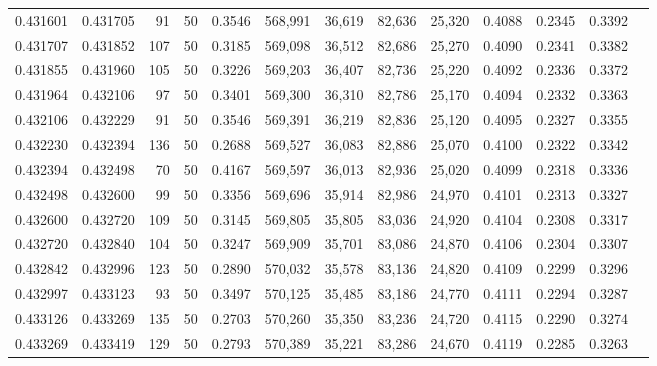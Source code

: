 \begin{tabular}{rrrrrrrrrrrrr}
0.431601 & 0.431705 &    91 &  50 &                                     0.3546 & 568,991 &  36,619 &  82,636 &  25,320 & 0.4088 & 0.2345 & 0.3392 \\
0.431707 & 0.431852 &   107 &  50 &                                     0.3185 & 569,098 &  36,512 &  82,686 &  25,270 & 0.4090 & 0.2341 & 0.3382 \\
0.431855 & 0.431960 &   105 &  50 &                                     0.3226 & 569,203 &  36,407 &  82,736 &  25,220 & 0.4092 & 0.2336 & 0.3372 \\
0.431964 & 0.432106 &    97 &  50 &                                     0.3401 & 569,300 &  36,310 &  82,786 &  25,170 & 0.4094 & 0.2332 & 0.3363 \\
0.432106 & 0.432229 &    91 &  50 &                                     0.3546 & 569,391 &  36,219 &  82,836 &  25,120 & 0.4095 & 0.2327 & 0.3355 \\
0.432230 & 0.432394 &   136 &  50 &                                     0.2688 & 569,527 &  36,083 &  82,886 &  25,070 & 0.4100 & 0.2322 & 0.3342 \\
0.432394 & 0.432498 &    70 &  50 &                                     0.4167 & 569,597 &  36,013 &  82,936 &  25,020 & 0.4099 & 0.2318 & 0.3336 \\
0.432498 & 0.432600 &    99 &  50 &                                     0.3356 & 569,696 &  35,914 &  82,986 &  24,970 & 0.4101 & 0.2313 & 0.3327 \\
0.432600 & 0.432720 &   109 &  50 &                                     0.3145 & 569,805 &  35,805 &  83,036 &  24,920 & 0.4104 & 0.2308 & 0.3317 \\
0.432720 & 0.432840 &   104 &  50 &                                     0.3247 & 569,909 &  35,701 &  83,086 &  24,870 & 0.4106 & 0.2304 & 0.3307 \\
0.432842 & 0.432996 &   123 &  50 &                                     0.2890 & 570,032 &  35,578 &  83,136 &  24,820 & 0.4109 & 0.2299 & 0.3296 \\
0.432997 & 0.433123 &    93 &  50 &                                     0.3497 & 570,125 &  35,485 &  83,186 &  24,770 & 0.4111 & 0.2294 & 0.3287 \\
0.433126 & 0.433269 &   135 &  50 &                                     0.2703 & 570,260 &  35,350 &  83,236 &  24,720 & 0.4115 & 0.2290 & 0.3274 \\
0.433269 & 0.433419 &   129 &  50 &                                     0.2793 & 570,389 &  35,221 &  83,286 &  24,670 & 0.4119 & 0.2285 & 0.3263 \\

\end{tabular}
